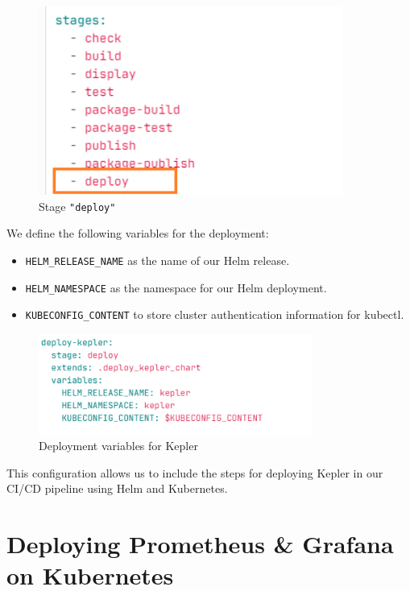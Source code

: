 \begin{figure}[H]
  \centering
  \includegraphics[width=10cm]{Figures/deploy-kepler-stage.png}
  \caption{Stage \texttt{"deploy"}}
\end{figure}

We define the following variables for the deployment:

\begin{itemize}
    \item \texttt{HELM\_RELEASE\_NAME} as the name of our Helm release.
    \item \texttt{HELM\_NAMESPACE} as the namespace for our Helm deployment.
    \item \texttt{KUBECONFIG\_CONTENT} to store cluster authentication information for kubectl.
\end{itemize}

\begin{figure}[H]
  \centering
  \includegraphics[width=0.8\textwidth]{Figures/deployment-variable.png}
  \caption{Deployment variables for Kepler}
\end{figure}

This configuration allows us to include the steps for deploying Kepler in our CI/CD pipeline using Helm and Kubernetes.


\section{Deploying Prometheus \& Grafana on Kubernetes}

